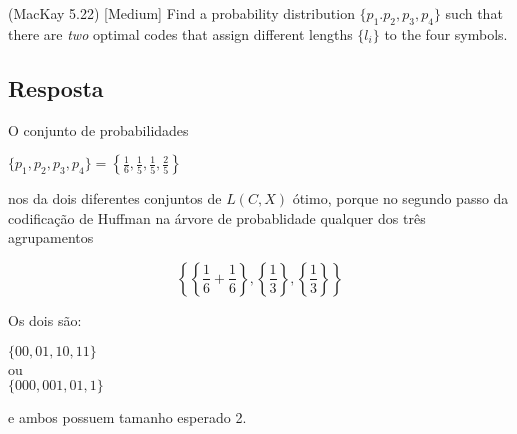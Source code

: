 (MacKay 5.22) [Medium]
Find a probability distribution $\{p_1. p_2, p_3, p_4\}$ such that there are \textit{two} optimal codes that assign different lengths $\{l_i\}$ to the four symbols.

\subsection*{Resposta}

O conjunto de probabilidades

$\displaystyle\{p_1, p_2, p_3, p_4\} = \left\{ \frac{1}{6}, \frac{1}{5}, \frac{1}{5}, \frac{2}{5} \right\}$

nos da dois diferentes conjuntos de $L(C, X)$ ótimo, porque no segundo passo da codificação de Huffman na árvore de probablidade qualquer dos três agrupamentos

\[\left\{ {\left\{ {\frac{1}{6} + \frac{1}{6}} \right\},\left\{ {\frac{1}{3}} \right\},\left\{ {\frac{1}{3}} \right\}} \right\}\]

Os dois são:

\begin{center}
$\{00, 01, 10, 11\}$ \\
ou \\
$\{000, 001, 01, 1\}$
\end{center}

e ambos possuem tamanho esperado 2.



